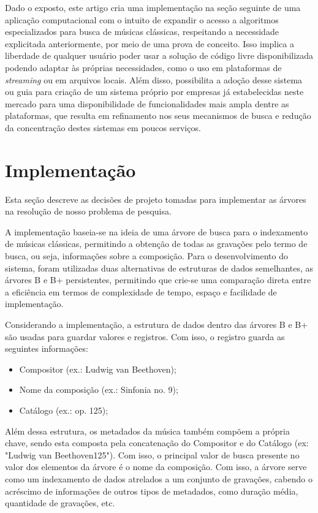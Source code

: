 \documentclass[12pt]{article}
\begin{document}
Dado o exposto, este artigo cria uma implementação na seção seguinte de uma aplicação
computacional com o intuito de expandir o acesso a algoritmos especializados para busca
de músicas clássicas, respeitando a necessidade explicitada anteriormente, por
meio de uma prova de conceito. Isso implica a liberdade de qualquer usuário
poder usar a solução de código livre disponibilizada podendo adaptar às próprias
necessidades, como o uso em plataformas de \emph{streaming} ou em arquivos
locais. Além disso, possibilita a adoção desse sistema ou guia para criação de um sistema
próprio por empresas já estabelecidas neste mercado
para uma disponibilidade de funcionalidades mais
ampla dentre as plataformas, que resulta em refinamento nos seus mecanismos de busca e redução
da concentração destes sistemas em poucos serviços.

\section{Implementação} \label{sec:implementation}
Esta seção descreve as decisões de projeto tomadas para implementar as árvores
na resolução de nosso problema de pesquisa.

A implementação baseia-se na ideia de uma árvore de busca para o indexamento de
músicas clássicas, permitindo a obtenção de todas as gravações pelo termo de
busca, ou seja, informações sobre a composição. Para o desenvolvimento do sistema, foram
utilizadas duas alternativas de estruturas de dados semelhantes, as árvores B e
B\nolinebreak+ persistentes, permitindo que crie-se uma comparação direta entre
a eficiência em termos de complexidade de tempo, espaço e facilidade de
implementação.

Considerando a implementação, a estrutura de dados dentro das árvores B e
B\nolinebreak+ são usadas para guardar valores e registros. Com isso, o registro
guarda as seguintes informações:
\begin{itemize}
  \item Compositor (ex.: Ludwig van Beethoven);
  \item Nome da composição (ex.: Sinfonia no. 9);
  \item Catálogo (ex.: op. 125);
\end{itemize}

Além dessa estrutura, os metadados da música também compõem a própria chave,
sendo esta composta pela concatenação do Compositor e do Catálogo (ex:
"Ludwig van Beethoven125"). Com isso, o principal valor de busca presente no
valor dos elementos da árvore é o nome da composição. Com isso, a árvore serve
como um indexamento de dados atrelados a um conjunto de gravações, cabendo o
acréscimo de informações de outros tipos de metadados, como duração média,
quantidade de gravações, etc.
\end{document}
